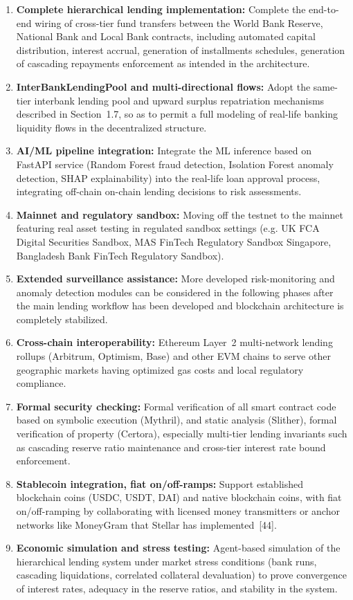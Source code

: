 \documentclass[12pt,a4paper]{report}
\begin{document}
\begin{enumerate}[noitemsep]
\item \textbf{Complete hierarchical lending implementation:} Complete the end-to-end wiring of cross-tier fund transfers between the World Bank Reserve, National Bank and Local Bank contracts, including automated capital distribution, interest accrual, generation of installments schedules, generation of cascading repayments enforcement as intended in the architecture.
\item \textbf{InterBankLendingPool and multi-directional flows:} Adopt the same-tier interbank lending pool and upward surplus repatriation mechanisms described in Section~1.7, so as to permit a full modeling of real-life banking liquidity flows in the decentralized structure.
\item \textbf{AI/ML pipeline integration:} Integrate the ML inference based on FastAPI service (Random Forest fraud detection, Isolation Forest anomaly detection, SHAP explainability) into the real-life loan approval process, integrating off-chain on-chain lending decisions to risk assessments.
\item \textbf{Mainnet and regulatory sandbox:} Moving off the testnet to the mainnet featuring real asset testing in regulated sandbox settings (e.g. UK FCA Digital Securities Sandbox, MAS FinTech Regulatory Sandbox Singapore, Bangladesh Bank FinTech Regulatory Sandbox).
\item \textbf{Extended surveillance assistance:} More developed risk-monitoring and anomaly detection modules can be considered in the following phases after the main lending workflow has been developed and blockchain architecture is completely stabilized.
\item \textbf{Cross-chain interoperability:} Ethereum Layer~2 multi-network lending rollups (Arbitrum, Optimism, Base) and other EVM chains to serve other geographic markets having optimized gas costs and local regulatory compliance.
\item \textbf{Formal security checking:} Formal verification of all smart contract code based on symbolic execution (Mythril), and static analysis (Slither), formal verification of property (Certora), especially multi-tier lending invariants such as cascading reserve ratio maintenance and cross-tier interest rate bound enforcement.
\item \textbf{Stablecoin integration, fiat on/off-ramps:} Support established blockchain coins (USDC, USDT, DAI) and native blockchain coins, with fiat on/off-ramping by collaborating with licensed money transmitters or anchor networks like MoneyGram that Stellar has implemented~[44].
\item \textbf{Economic simulation and stress testing:} Agent-based simulation of the hierarchical lending system under market stress conditions (bank runs, cascading liquidations, correlated collateral devaluation) to prove convergence of interest rates, adequacy in the reserve ratios, and stability in the system.
\end{enumerate}
\end{document}
